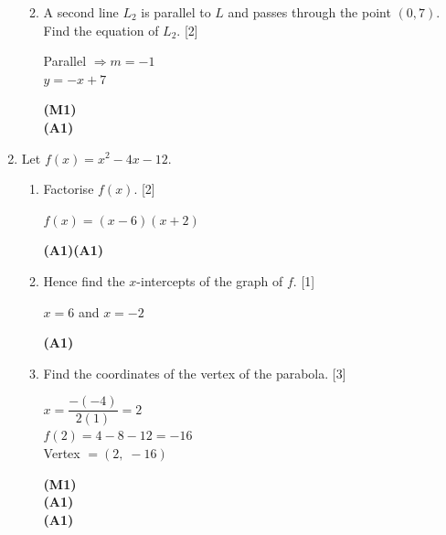 \documentclass[12pt, twoside]{article}
\begin{document}
\begin{enumerate}[itemsep=0.2cm]
\begin{enumerate}[itemsep=0.3cm]
  \medskip
  \item A second line $L_2$ is parallel to $L$ and passes through the
        point $(0, 7)$. Find the equation of $L_2$. \hfill [2]

  \begin{minipage}[t]{0.62\textwidth}
  Parallel $\Rightarrow m = -1$\\[0.15cm]
  $y = -x + 7$
  \end{minipage}%
  \begin{minipage}[t]{0.35\textwidth}\raggedleft
  \textbf{(M1)}\\[0.15cm]
  \textbf{(A1)}
  \end{minipage}
\end{enumerate}

\newpage

\item Let $f(x) = x^2 - 4x - 12$.

\begin{enumerate}[itemsep=0.3cm]
  \item Factorise $f(x)$. \hfill [2]

  \begin{minipage}[t]{0.62\textwidth}
  $f(x) = (x - 6)(x + 2)$
  \end{minipage}%
  \begin{minipage}[t]{0.35\textwidth}\raggedleft
  \textbf{(A1)(A1)}
  \end{minipage}

  \medskip
  \item Hence find the $x$-intercepts of the graph of $f$. \hfill [1]

  \begin{minipage}[t]{0.62\textwidth}
  $x = 6$ and $x = -2$
  \end{minipage}%
  \begin{minipage}[t]{0.35\textwidth}\raggedleft
  \textbf{(A1)}
  \end{minipage}

  \medskip
  \item Find the coordinates of the vertex of the parabola. \hfill [3]

  \begin{minipage}[t]{0.62\textwidth}
  $x = \dfrac{-(-4)}{2(1)} = 2$\\[0.15cm]
  $f(2) = 4 - 8 - 12 = -16$\\[0.15cm]
  Vertex $= (2,\; -16)$
  \end{minipage}%
  \begin{minipage}[t]{0.35\textwidth}\raggedleft
  \textbf{(M1)}\\[0.15cm]
  \textbf{(A1)}\\[0.15cm]
  \textbf{(A1)}
  \end{minipage}


\end{enumerate}
\end{enumerate}
\end{document}
